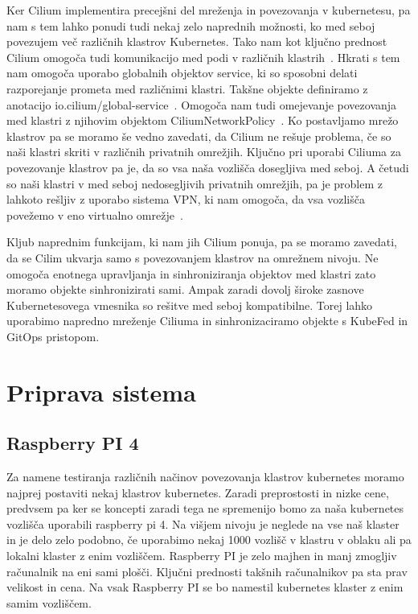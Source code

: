 \documentclass[a4paper, 12pt]{book}
\begin{document}
Ker Cilium implementira precejšni del mreženja in povezovanja v kubernetesu, pa nam s tem lahko ponudi tudi nekaj zelo naprednih možnosti, ko med seboj povezujem več različnih klastrov Kubernetes.
Tako nam kot ključno prednost Cilium omogoča tudi komunikacijo med podi v različnih klastrih~\cite{cilium-cluster-mesh}.
Hkrati s tem nam omogoča uporabo globalnih objektov service, ki so sposobni delati razporejanje prometa med različnimi klastri.
Takšne objekte definiramo z anotacijo io.cilium/global-service~\cite{setup-cilium-cluster-mesh}.
Omogoča nam tudi omejevanje povezovanja med klastri z njihovim objektom CiliumNetworkPolicy~\cite{setup-cilium-cluster-mesh}.
Ko postavljamo mrežo klastrov pa se moramo še vedno zavedati, da Cilium ne rešuje problema, če so naši klastri skriti v različnih privatnih omrežjih.
Ključno pri uporabi Ciliuma za povezovanje klastrov pa je, da so vsa naša vozlišča dosegljiva med seboj.
A četudi so naši klastri v med seboj nedosegljivih privatnih omrežjih, pa je problem z lahkoto rešljiv z uporabo sistema VPN, ki nam omogoča, da vsa vozlišča povežemo v eno virtualno omrežje~\cite{setup-cilium-cluster-mesh}.

Kljub naprednim funkcijam, ki nam jih Cilium ponuja, pa se moramo zavedati, da se Cilim ukvarja samo s povezovanjem klastrov na omrežnem nivoju.
Ne omogoča enotnega upravljanja in sinhroniziranja objektov med klastri zato moramo objekte sinhronizirati sami.
Ampak zaradi dovolj široke zasnove Kubernetesovega vmesnika so rešitve med seboj kompatibilne.
Torej lahko uporabimo napredno mreženje Ciliuma in sinhronizaciramo objekte s KubeFed in GitOps pristopom.
\chapter{Priprava sistema}
\section{Raspberry PI 4}
Za namene testiranja različnih načinov povezovanja klastrov kubernetes moramo najprej postaviti nekaj klastrov kubernetes.
Zaradi preprostosti in nizke cene, predvsem pa ker se koncepti zaradi tega ne spremenijo bomo za naša kubernetes vozlišča uporabili raspberry pi 4.
  Na višjem nivoju je neglede na vse naš klaster in je delo zelo podobno, če uporabimo nekaj 1000 vozlišč v klastru v oblaku ali pa lokalni klaster z enim vozliščem.
Raspberry PI je zelo majhen in manj zmogljiv računalnik na eni sami plošči.
Ključni prednosti takšnih računalnikov pa sta prav velikost in cena.
Na vsak Raspberry PI se bo namestil kubernetes klaster z enim samim vozliščem.
\end{document}
